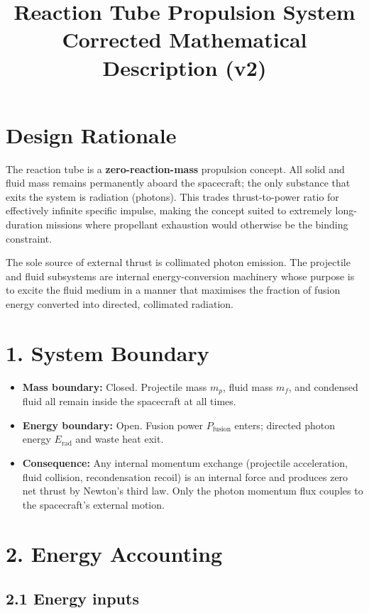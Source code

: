 \documentclass[12pt]{article}
\title{Reaction Tube Propulsion System\\
       \large Corrected Mathematical Description (v2)}
\date{}
\begin{document}
\maketitle

\section*{Design Rationale}

The reaction tube is a \textbf{zero-reaction-mass} propulsion concept. All solid
and fluid mass remains permanently aboard the spacecraft; the only substance that
exits the system is radiation (photons). This trades thrust-to-power ratio for
effectively infinite specific impulse, making the concept suited to extremely
long-duration missions where propellant exhaustion would otherwise be the binding
constraint.

The sole source of external thrust is collimated photon emission. The
projectile and fluid subsystems are internal energy-conversion machinery whose
purpose is to excite the fluid medium in a manner that maximises the fraction of
fusion energy converted into directed, collimated radiation.

\section*{1. System Boundary}

\begin{itemize}
  \item \textbf{Mass boundary:} Closed. Projectile mass $m_p$, fluid mass $m_f$, and
        condensed fluid all remain inside the spacecraft at all times.
  \item \textbf{Energy boundary:} Open. Fusion power $P_{\mathrm{fusion}}$ enters;
        directed photon energy $E_{\mathrm{rad}}$ and waste heat exit.
  \item \textbf{Consequence:} Any internal momentum exchange (projectile
        acceleration, fluid collision, recondensation recoil) is an internal force
        and produces zero net thrust by Newton's third law. Only the photon
        momentum flux couples to the spacecraft's external motion.
\end{itemize}

\section*{2. Energy Accounting}

\subsection*{2.1 Energy inputs}
\end{document}
